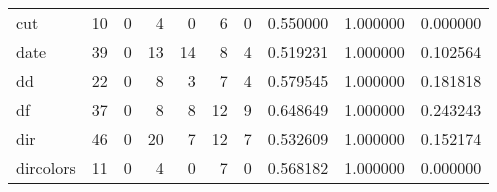 \begin{tabular}{lrrrrrrrrr}
cut       &                                       10 &                                                  0 &                                                  4 &                                                  0 &                                                  6 &                                                  0 &                                           0.550000 &                               1.000000 &                             0.000000 \\
date      &                                       39 &                                                  0 &                                                 13 &                                                 14 &                                                  8 &                                                  4 &                                           0.519231 &                               1.000000 &                             0.102564 \\
dd        &                                       22 &                                                  0 &                                                  8 &                                                  3 &                                                  7 &                                                  4 &                                           0.579545 &                               1.000000 &                             0.181818 \\
df        &                                       37 &                                                  0 &                                                  8 &                                                  8 &                                                 12 &                                                  9 &                                           0.648649 &                               1.000000 &                             0.243243 \\
dir       &                                       46 &                                                  0 &                                                 20 &                                                  7 &                                                 12 &                                                  7 &                                           0.532609 &                               1.000000 &                             0.152174 \\
dircolors &                                       11 &                                                  0 &                                                  4 &                                                  0 &                                                  7 &                                                  0 &                                           0.568182 &                               1.000000 &                             0.000000 \\

\end{tabular}
